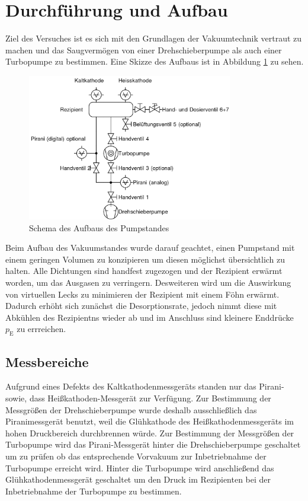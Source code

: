 \section{Durchführung und Aufbau}
\label{sec:Durchführung}
Ziel des Versuches ist es sich mit den Grundlagen der Vakuumtechnik vertraut zu machen und das Saugvermögen von einer Drehschieberpumpe als auch einer Turbopumpe zu bestimmen. Eine Skizze des Aufbaus ist in Abbildung \ref{fig:pump} zu sehen.
\begin{figure}[htpb]
  \centering
\includegraphics[width=0.8\textwidth]{picture/pumpaufbau.png}
\caption{Schema des Aufbaus des Pumpstandes \cite{Pfeiffer}}
  \label{fig:pump}
\end{figure}
Beim Aufbau des Vakuumstandes wurde darauf geachtet, einen Pumpstand mit einem geringen Volumen zu konzipieren um diesen möglichst übersichtlich zu halten. Alle Dichtungen sind handfest zugezogen und der Rezipient erwärmt worden, um das Ausgasen zu verringern. Desweiteren wird um die Auswirkung von virtuellen Lecks zu minimieren der Rezipient mit einem Föhn erwärmt. Dadurch erhöht sich zunächst die Desorptionsrate, jedoch nimmt diese mit Abkühlen des Rezipientns wieder ab und im Anschluss sind kleinere Enddrücke $p_\text{E}$ zu errreichen.
\subsection{Messbereiche}
Aufgrund eines Defekts des Kaltkathodenmessgeräts standen nur das Pirani- sowie, dass Heißkathoden-Messgerät zur Verfügung. Zur Bestimmung der Messgrößen der Drehschieberpumpe wurde deshalb ausschließlich das Piranimessgerät benutzt, weil die Glühkathode des Heißkathodenmessgeräts im hohen Druckbereich durchbrennen würde. \newline
Zur Bestimmung der Messgrößen der Turbopumpe wird das Pirani-Messgerät hinter die Drehschieberpumpe geschaltet um zu prüfen ob das entsprechende Vorvakuum zur Inbetriebnahme der Turbopumpe erreicht wird. Hinter die Turbopumpe wird anschließend das Glühkathodenmessgerät geschaltet um den Druck im Rezipienten bei der Inbetriebnahme der Turbopumpe zu bestimmen.
